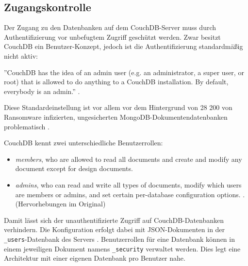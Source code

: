 \subsection{Zugangskontrolle}

Der Zugang zu den Datenbanken auf dem CouchDB-Server muss durch Authentifizierung vor unbefugtem Zugriff geschützt werden. Zwar besitzt CouchDB ein Benutzer-Konzept, jedoch ist die Authentifizierung standardmäßig nicht aktiv:

\begin{citeenv}
		''CouchDB has the idea of an admin user (e.g. an administrator, a super user, or root) that is allowed to do anything to a CouchDB installation. By default, everybody is an admin.'' \cite{couch:security}.
\end{citeenv}

Diese Standardeinstellung ist vor allem vor dem Hintergrund von 28 200 von Ransomware infizierten, ungesicherten MongoDB-Dokumentendatenbanken problematisch \cite{bleepingcomputer:mongodb:security}.

CouchDB kennt zwei unterschiedliche Benutzerrollen:

\begin{citeenv}
	\begin{itemize}
		\item \textit{members}, who are allowed to read all documents and create and modify any document except for design documents.
		\item \textit{admins}, who can read and write all types of documents, modify which users are members or admins, and set certain per-database configuration options.  \cite{couch:security}. (Hervorhebungen im Original)
	\end{itemize}
\end{citeenv}

Damit lässt sich der unauthentifizierte Zugriff auf CouchDB-Datenbanken verhindern. Die Konfiguration erfolgt dabei mit JSON-Dokumenten in der \texttt{\_users}-Datenbank des Servers \cite{couch:security}. Benutzerrollen für eine Datenbank können in einem jeweiligen Dokument namens \texttt{\_security} verwaltet werden. Dies legt eine Architektur mit einer eigenen Datenbank pro Benutzer nahe.